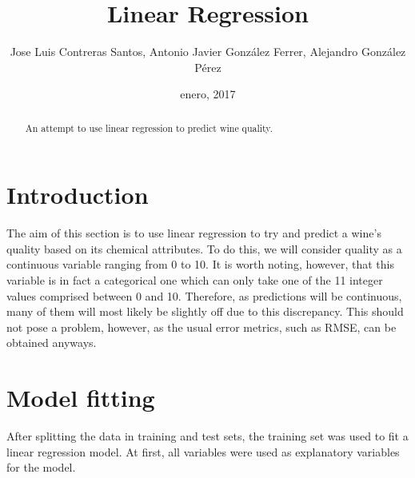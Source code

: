 \documentclass[12pt,]{article}
\title{Linear Regression}
\author{Jose Luis Contreras Santos, Antonio Javier González Ferrer, Alejandro
González Pérez}
\date{enero, 2017}
\newenvironment{Shaded}{\begin{snugshade}}{\end{snugshade}}
\newcommand{\KeywordTok}[1]{\textcolor[rgb]{0.13,0.29,0.53}{\textbf{{#1}}}}
\newcommand{\DataTypeTok}[1]{\textcolor[rgb]{0.13,0.29,0.53}{{#1}}}
\newcommand{\DecValTok}[1]{\textcolor[rgb]{0.00,0.00,0.81}{{#1}}}
\newcommand{\FloatTok}[1]{\textcolor[rgb]{0.00,0.00,0.81}{{#1}}}
\newcommand{\StringTok}[1]{\textcolor[rgb]{0.31,0.60,0.02}{{#1}}}
\newcommand{\CommentTok}[1]{\textcolor[rgb]{0.56,0.35,0.01}{\textit{{#1}}}}
\newcommand{\NormalTok}[1]{{#1}}
\begin{document}
\maketitle
\begin{abstract}
An attempt to use linear regression to predict wine quality.
\end{abstract}

\section{Introduction}\label{introduction}

The aim of this section is to use linear regression to try and predict a
wine's quality based on its chemical attributes. To do this, we will
consider quality as a continuous variable ranging from 0 to 10. It is
worth noting, however, that this variable is in fact a categorical one
which can only take one of the 11 integer values comprised between 0 and
10. Therefore, as predictions will be continuous, many of them will most
likely be slightly off due to this discrepancy. This should not pose a
problem, however, as the usual error metrics, such as RMSE, can be
obtained anyways.

\section{Model fitting}\label{model-fitting}

After splitting the data in training and test sets, the training set was
used to fit a linear regression model. At first, all variables were used
as explanatory variables for the model.

\begin{Shaded}
\end{Shaded}
\end{document}
